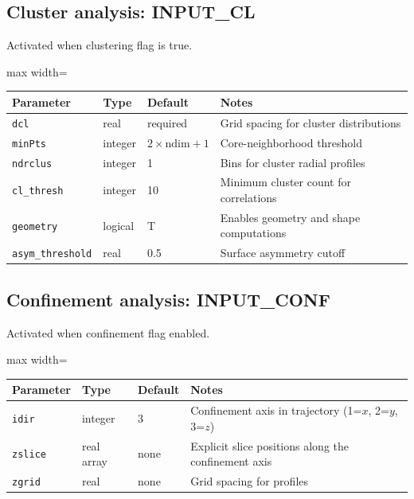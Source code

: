 \documentclass[final,1p,times]{elsarticle}
\begin{document}
\subsection{Cluster analysis: INPUT\_CL}
Activated when clustering flag is true.
\begin{center}
\begin{adjustbox}{max width=\textwidth}
\begin{tabular}{llll}
\hline
Parameter & Type & Default & Notes \\
\hline
\texttt{dcl} & real & required & Grid spacing for cluster distributions \\
\texttt{minPts} & integer & $2\times\text{ndim}+1$ & Core-neighborhood threshold \\
\texttt{ndrclus} & integer & 1 & Bins for cluster radial profiles \\
\texttt{cl\_thresh} & integer & 10 & Minimum cluster count for correlations \\
\texttt{geometry} & logical & T & Enables geometry and shape computations \\
\texttt{asym\_threshold} & real & 0.5 & Surface asymmetry cutoff \\
\hline
\end{tabular}
\end{adjustbox}
\end{center}

\subsection{Confinement analysis: INPUT\_CONF}
Activated when confinement flag enabled.
\begin{center}
\begin{adjustbox}{max width=\textwidth}
\begin{tabular}{llll}
\hline
Parameter & Type & Default & Notes \\
\hline
\texttt{idir} & integer & 3 & Confinement axis in trajectory (1=$x$, 2=$y$, 3=$z$) \\
\texttt{zslice} & real array & none & Explicit slice positions along the confinement axis \\
\texttt{zgrid} & real & none & Grid spacing for profiles \\
\hline
\end{tabular}
\end{adjustbox}
\end{center}
\end{document}
